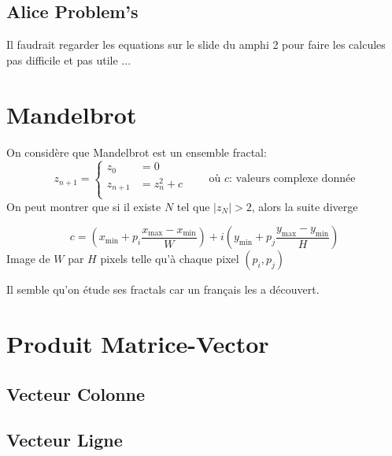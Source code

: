 \documentclass{article}
\begin{document}
\subsection{Alice Problem's}
\begin{resolution}
    Il faudrait regarder les equations sur le slide du amphi 2 pour faire les calcules pas difficile et pas utile
    ...
    
\end{resolution}

\section{Mandelbrot}
\begin{resolution}
    On considère que Mandelbrot est un ensemble fractal:
    \begin{equation}
        z_{n+1} = 
        \begin{cases}
            z_{0}   &= 0\\
            z_{n+1} &= z_{n}^{2} + c\\
        \end{cases}
        \qquad\text{où $c$: valeurs complexe donnée}
    \end{equation}
    On peut montrer que si il existe $N$ tel que $|z_N|>2$, alors la suite diverge

    \begin{equation}
        c = (x_{\min} + p_{i}\frac{x_{\max} - x_{\min}}{W}) + i(y_{\min} + p_{j}\frac{y_{\max} - y_{\min}}{H})
    \end{equation}
    Image de $W$ par $H$ pixels telle qu'à chaque pixel $(p_{i}, p_{j})$

    Il semble qu'on étude ses fractals car un français les a découvert.
    
\end{resolution}

\section{Produit Matrice-Vector}
\subsection{Vecteur Colonne}
\begin{resolution}
    
\end{resolution}

\subsection{Vecteur Ligne}
\begin{resolution}
    
\end{resolution}
\end{document}
